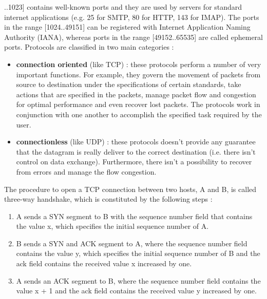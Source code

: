 \documentclass[11pt]{article}
\begin{document}
..1023] contains well-known ports and they are used by servers for standard internet applications (e.g. 25 for SMTP, 80 for HTTP, 143 for IMAP). The ports in the range [1024..49151] can be registered with Internet Application Naming Authority (IANA), whereas ports in the range [49152..65535] are called ephemeral ports. Protocols are classified in two main categories :
\begin{itemize}
\item \textbf{connection oriented} (like TCP) : these protocols perform a number of very important functions. For example, they govern the movement of packets from source to destination under the specifications of certain standards, take actions that are specified in the packets, manage packet flow and congestion for optimal performance and even recover lost packets. The protocols work in conjunction with one another to accomplish the specified task required by the user.
\item \textbf{connectionless} (like UDP) : these protocols doesn't provide any guarantee that the datagram is really deliver to the correct destination (i.e. there isn't control on data exchange). Furthermore, there isn't a possibility to recover from errors and manage the flow congestion.
\end{itemize}
The procedure to open a TCP connection between two hosts, A and B, is called three-way handshake, which is constituted by the following steps :
\begin{enumerate}
\item A sends a SYN segment to B with the sequence number field that contains the value x, which specifies the initial sequence number of A.
\item B sends a SYN and ACK segment to A, where the sequence number field contains the value y, which specifies the initial sequence number of B and the ack field contains the received value x increased by one.
\item A sends an ACK segment to B, where the sequence number field contains the value x + 1 and the ack field contains the received value y increased by one.
\end{enumerate}
\end{document}
